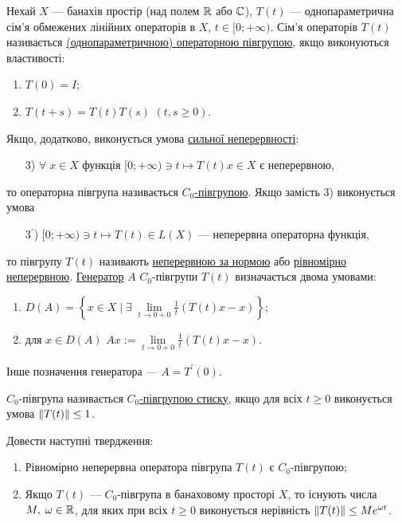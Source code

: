 
\begin{theory}
    Нехай $X$ --- банахів простір (над полем $\mathbb{R}$ або $\mathbb{C}$),
    $T(t)$ --- однопараметрична сім'я обмежених лінійних операторів в $X$, $t \in [0; +\infty)$.
    Сім'я операторів $T(t)$ називається \uline{(однопараметричною) операторною півгрупою}, якщо
    виконуються властивості:
    \begin{enumerate}[label = \arabic*)]
        \item $T(0) = I$;
        \item $T(t+s) = T(t) T(s)$ $(t, s \geq 0)$.
    \end{enumerate}
    Якщо, додатково, виконується умова \uline{сильної неперервності}:
    \begin{enumerate}[label = \arabic*)]
        \item[3)] $\forall \; x \in X$ функція $[0; +\infty) \ni t \mapsto T(t)x \in X$ є неперервною,
    \end{enumerate}
    то операторна півгрупа називається \uline{$C_0$-півгрупою}.
    Якщо замість 3) виконується умова 
    \begin{enumerate}[label = \arabic*)]
        \item[3$^\prime$)] $[0; +\infty) \ni t \mapsto T(t) \in L(X)$ --- неперервна операторна функція,
    \end{enumerate} 
    то півгрупу $T(t)$ називають \uline{неперервною за нормою} або
    \ul{рівномірно неперервною}.
    \noindent\uline{Генератор} $A$ $C_0$-півгрупи $T(t)$ визначається двома умовами:
    \begin{enumerate}
        \item $D(A) = \left\{ x \in X \mid \exists \; \underset{t\to 0+0}{\lim} \frac{1}{t} (T(t)x - x)\right\}$;
        \item для $x \in D(A)$ $Ax := \underset{t\to 0+0}{\lim} \frac{1}{t} (T(t)x - x)$.
    \end{enumerate}
    Інше позначення генератора --- $A = T^\prime (0)$.

    \noindent $C_0$-півгрупа називається \uline{$C_0$-півгрупою стиску},
    якщо для всіх $t \geq 0$ виконується умова $\left\lVert T(t)\right\rVert \leq 1$.
\end{theory}

\begin{exercise}
    Довести наступні твердження:
    \begin{enumerate}
        \item Рівномірно неперервна оператора півгрупа $T(t)$ є $C_0$-півгрупою;
        \item Якщо $T(t)$ --- $C_0$-півгрупа в банаховому просторі $X$, то існують числа $M, \; \omega \in \mathbb{R}$,
        для яких при всіх $t \geq 0$ виконується нерівність $\left\lVert T(t)\right\rVert \leq M e^{\omega t}$.
    \end{enumerate}
\end{exercise}

